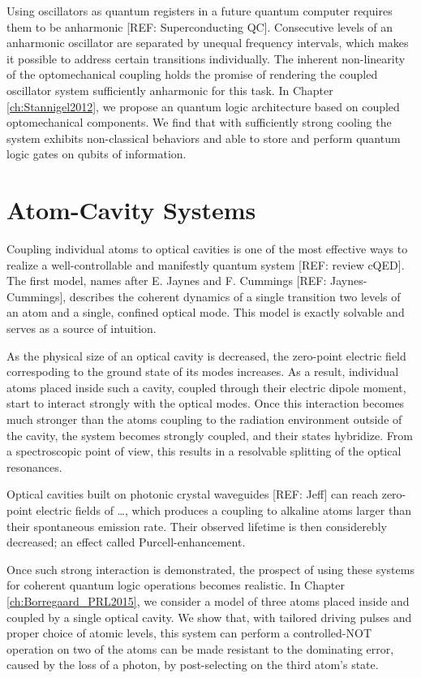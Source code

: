 Using oscillators as quantum registers in a future quantum computer requires
them to be anharmonic [REF: Superconducting QC]. Consecutive levels of an
anharmonic oscillator are separated by unequal frequency intervals, which makes
it possible to address certain transitions individually. The inherent
non-linearity of the optomechanical coupling holds the promise of rendering the
coupled oscillator system sufficiently anharmonic for this task. In Chapter
\ref{ch:Stannigel2012}, we propose an quantum logic architecture based on
coupled optomechanical components. We find that with sufficiently strong cooling
the system exhibits non-classical behaviors and able to store and perform
quantum logic gates on qubits of information.






\section{Atom-Cavity Systems}
Coupling individual atoms to optical cavities is one of the most effective ways
to realize a well-controllable and manifestly quantum system [REF:
review cQED]. The first model, names after E. Jaynes and F. Cummings [REF:
Jaynes-Cummings], describes the coherent dynamics of a single 
transition two levels of an atom and a single, confined optical mode. This model
is exactly solvable and serves as a source of intuition.

As the physical size of an optical cavity is decreased, the zero-point
electric field correspoding to the ground state of its modes increases.
As a result, individual atoms placed inside such a cavity, coupled through their
electric dipole moment, start to interact strongly with the optical modes. Once
this interaction becomes much stronger than the atoms coupling to the radiation
environment outside of the cavity, the system becomes strongly coupled, and
their states hybridize. From a spectroscopic point of view, this results in a
resolvable splitting of the optical resonances.

Optical cavities built on photonic crystal waveguides [REF: Jeff] can reach
zero-point electric fields of  \ldots, which produces a coupling to
alkaline atoms larger than their spontaneous emission rate. Their
observed lifetime is then considerebly decreased; an effect called
Purcell-enhancement.

Once such strong interaction is demonstrated, the prospect of using these
systems for coherent quantum logic operations becomes realistic. In Chapter
\ref{ch:Borregaard_PRL2015}, we consider a model of three atoms placed inside
and coupled by a single optical cavity. We show that, with tailored driving pulses
and proper choice of atomic levels, this system can perform a controlled-NOT
operation on two of the atoms can be made resistant to the dominating error,
caused by the loss of a photon, by post-selecting on the third atom's
state.

